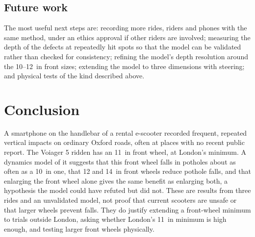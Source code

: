 \subsection{Future work}

The most useful next steps are: recording more rides, riders and phones with the same method, under an ethics approval if
other riders are involved; measuring the depth of the defects at repeatedly hit spots so that
the model can be validated rather than checked for consistency; refining the model's depth
resolution around the 10--12~in front sizes; extending the model to three dimensions with
steering; and physical tests of the kind described above.

\section{Conclusion}\label{sec:conclusion}

A smartphone on the handlebar of a rental e-scooter recorded frequent, repeated vertical
impacts on ordinary Oxford roads, often at places with no recent public report. The
Voiager 5 ridden has an 11~in front wheel, at London's minimum. A dynamics model of it
suggests that this front wheel falls in potholes about as often as a 10~in one, that 12 and
14~in front wheels reduce pothole falls, and that enlarging the front wheel alone gives the
same benefit as enlarging both, a hypothesis the model could have refuted but did not. These
are results from three rides and an unvalidated model, not proof that current scooters are
unsafe or that larger wheels prevent falls. They do justify extending a front-wheel
minimum to trials outside London, asking whether London's 11~in minimum is high enough, and
testing larger front wheels physically.
